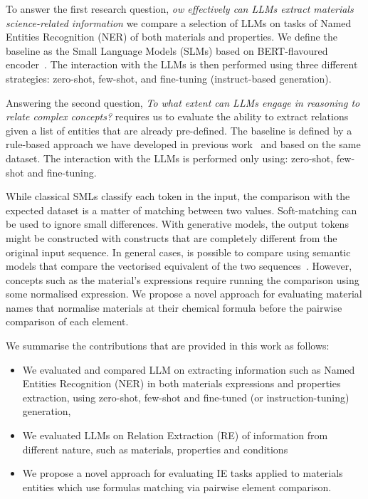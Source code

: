 \documentclass[a4paper]{article}
\begin{document}
To answer the first research question, \textit{ow effectively can LLMs extract materials science-related information} we compare a selection of LLMs on tasks of Named Entities Recognition (NER) of both materials and properties.  
We define the baseline as the Small Language Models (SLMs) based on BERT-flavoured encoder~\cite{beltagy2020scibert}. 
The interaction with the LLMs is then performed using three different strategies: zero-shot, few-shot, and fine-tuning (instruct-based generation). 

Answering the second question, \textit{To what extent can LLMs engage in reasoning to relate complex concepts?} requires us to evaluate the ability to extract relations given a list of entities that are already pre-defined. 
The baseline is defined by a rule-based approach we have developed in previous work~\cite{lfoppiano2023automatic} and based on the same dataset. 
The interaction with the LLMs is performed only using: zero-shot, few-shot and fine-tuning.  
 
While classical SMLs classify each token in the input, the comparison with the expected dataset is a matter of matching between two values. Soft-matching can be used to ignore small differences. 
With generative models, the output tokens might be constructed with constructs that are completely different from the original input sequence. 
In general cases, is possible to compare using semantic models that compare the vectorised equivalent of the two sequences~\cite{reimers2019sentencebert}. 
However, concepts such as the material's expressions require running the comparison using some normalised expression. 
We propose a novel approach for evaluating material names that normalise materials at their chemical formula before the pairwise comparison of each element. 

We summarise the contributions that are provided in this work as follows: 

\begin{itemize}
    \item We evaluated and compared LLM on extracting information such as Named Entities Recognition (NER) in both materials expressions and properties extraction, using zero-shot, few-shot and fine-tuned (or instruction-tuning) generation,
    \item We evaluated LLMs on Relation Extraction (RE) of information from different nature, such as materials, properties and conditions
    \item We propose a novel approach for evaluating IE tasks applied to materials entities which use formulas matching via pairwise element comparison.
\end{itemize}
\end{document}
